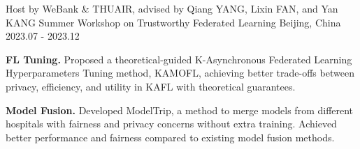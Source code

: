 
\begin{cventries}

\cventry
{Host by WeBank \& THUAIR, advised by Qiang YANG, Lixin FAN, and Yan KANG}
{Summer Workshop on Trustworthy Federated Learning}
{Beijing, China}
{2023.07 - 2023.12}
{
\begin{cvitems}
\item {\textbf{FL Tuning.} Proposed a theoretical-guided K-Asynchronous Federated Learning Hyperparameters Tuning method, KAMOFL, achieving better trade-offs between privacy, efficiency, and utility in KAFL with theoretical guarantees.}
\item {\textbf{Model Fusion.} Developed ModelTrip, a method to merge models from different hospitals with fairness and privacy concerns without extra training. Achieved better performance and fairness compared to existing model fusion methods.}
\end{cvitems}
}

\end{cventries}





